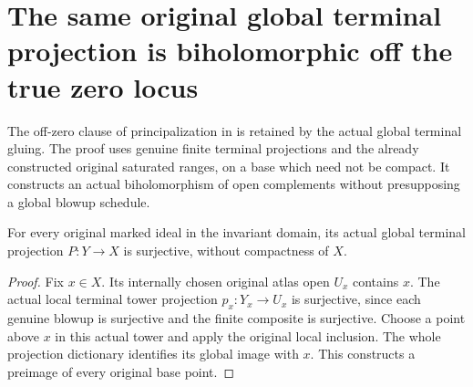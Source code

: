 \section{The same original global terminal projection is biholomorphic off the true zero locus}

The off-zero clause of principalization in \cite{wlodarczyk05-hironaka}
is retained by the actual global terminal gluing.  The proof uses genuine
finite terminal projections and the already constructed original saturated
ranges, on a base which need not be compact.  It constructs an actual
biholomorphism of open complements without presupposing a global blowup
schedule.

\begin{theorem}
\label{hir:original-global-terminal-projection-surjective}
\leanok
{}
For every original marked ideal in the invariant domain, its actual global
terminal projection $P:Y\to X$ is surjective, without compactness of $X$.
\end{theorem}
\begin{proof}
Fix $x\in X$.  Its internally chosen original atlas open $U_x$ contains
$x$.  The actual local terminal tower projection $p_x:Y_x\to U_x$ is
surjective, since each genuine blowup is surjective and the finite composite
is surjective.  Choose a point above $x$ in this actual tower and apply
the original local inclusion.  The whole projection dictionary identifies
its global image with $x$.  This constructs a preimage of every original
base point.
\end{proof}

